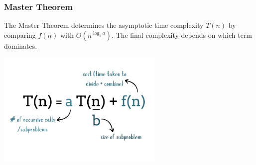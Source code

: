 
%    
%    
%

\begin{frame}
  \frametitle{Master Theorem}
  The Master Theorem determines the asymptotic time complexity $T(n)$ by comparing $f(n)$ with $O(n^{\log_b a})$. The final complexity depends on which term dominates.
  \begin{center}
      \includegraphics[width=0.6\textwidth]{figures/MasterTheorem/mt.jpg}
   \end{center}
  
\end{frame}


